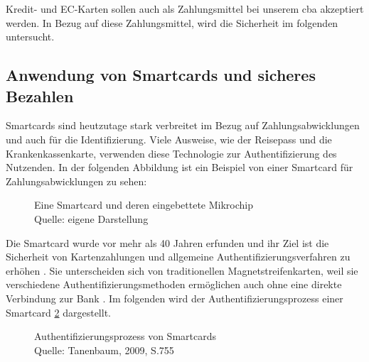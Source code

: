 Kredit- und EC-Karten sollen auch als Zahlungsmittel bei unserem \acrshort{cba} akzeptiert werden. 
In Bezug auf diese Zahlungsmittel, wird die Sicherheit im folgenden untersucht.

\subsection{Anwendung von Smartcards und sicheres Bezahlen}
Smartcards sind heutzutage stark verbreitet im Bezug auf Zahlungsabwicklungen und auch für die Identifizierung.
Viele Ausweise, wie der Reisepass und die Krankenkassenkarte, verwenden diese Technologie zur Authentifizierung
des Nutzenden. In der folgenden Abbildung ist ein Beispiel von einer Smartcard für Zahlungsabwicklungen zu sehen: 

\begin{figure}[H]
   \caption{Eine Smartcard und deren eingebettete Mikrochip\\Quelle: eigene Darstellung}
   \label{fig:eigenes_Bild}
\end{figure}

Die Smartcard wurde vor mehr als 40 Jahren erfunden und ihr Ziel ist die Sicherheit von Kartenzahlungen und 
allgemeine Authentifizierungsverfahren zu erhöhen \cite{refip:JFSB}. Sie unterscheiden sich von traditionellen 
Magnetstreifenkarten, weil sie verschiedene Authentifizierungsmethoden ermöglichen auch ohne eine direkte 
Verbindung zur Bank \cite{refbook:ATMS}. Im folgenden wird der Authentifizierungsprozess einer Smartcard 
\ref{fig:refbook_ATMS} dargestellt. 

\begin{figure}[H]
   \caption{Authentifizierungsprozess von Smartcards\\Quelle: Tanenbaum, 2009, S.755}
   \label{fig:refbook_ATMS}
\end{figure}

